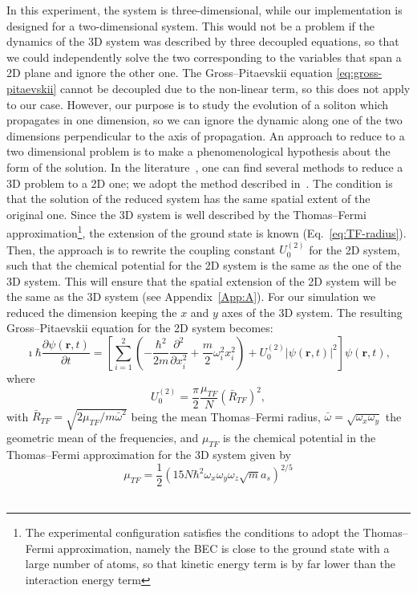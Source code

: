 In this experiment, the system is three-dimensional, while our implementation is designed for a two-dimensional system. This would not be a problem if the dynamics of the 3D system was described by three decoupled equations, so that we could independently solve the two corresponding to the variables that span a 2D plane and ignore the other one. The Gross--Pitaevskii equation \eqref{eq:gross-pitaevskii} cannot be decoupled due to the non-linear term, so this does not apply to our case. However, our purpose is to study the evolution of a soliton which propagates in one dimension, so we can ignore the dynamic along one of the two dimensions perpendicular to the axis of propagation. An approach to reduce to a two dimensional problem is to make a phenomenological hypothesis about the form of the solution. In the literature~\citep{JKP98,SZ98,Sal01,SPR02,MM03}, one can find several methods to reduce a 3D problem to a 2D one; we adopt the method described in~\citep{PietroMassignan}. The condition is that the solution of the reduced system has the same spatial extent of the original one. Since the 3D system is well described by the Thomas--Fermi approximation\footnote{The experimental configuration satisfies the conditions to adopt the Thomas--Fermi approximation, namely the BEC is close to the ground state with a large number of atoms, so that kinetic energy term is by far lower than the interaction energy term}, the extension of the ground state is known (Eq.~\eqref{eq:TF-radius}). Then, the approach is to rewrite the coupling constant $U_0^{(2)}$ for the 2D system, such that the chemical potential for the 2D system is the same as the one of the 3D system. This will ensure that the spatial extension of the 2D system will be the same as the 3D system (see Appendix~\ref{App:A}). For our simulation we reduced the dimension keeping the $x$ and $y$ axes of the 3D system. The resulting Gross--Pitaevskii equation for the 2D system becomes:
\begin{equation} \label{eq:gross-pitaevskii-simulation}
\imath \hbar \frac{\partial \psi(\textbf{r}, t)}{\partial t} = \left[ \sum_{i=1}^2 \left( -\frac{\hbar^2}{2m} \frac{\partial^2}{\partial x_i^2} + \frac{m}{2} \omega_i^2 x_i^2 \right) + U_0^{(2)} |\psi(\textbf{r}, t)|^2 \right] \psi(\textbf{r}, t),
\end{equation}
where
\begin{equation}
U_0^{(2)} = \frac{\pi}{2} \frac{\mu_{TF}}{N} \left( \bar{R}_{TF} \right)^2 ,
\end{equation}
with $\bar{R}_{TF} = \sqrt{2\mu_{TF} / m \bar{\omega}^2}$ being the mean Thomas--Fermi radius, $\bar{\omega} = \sqrt{ \omega_x \omega_y}$ the geometric mean of the frequencies,
and $\mu_{TF}$ is the chemical potential in the Thomas--Fermi approximation for the 3D system given by
\begin{equation}
\mu_{TF} = \frac{1}{2} \left( 15 N \hbar^2 \omega_x \omega_y \omega_z \sqrt{m} a_s \right)^{2/5}
\end{equation}
\\

